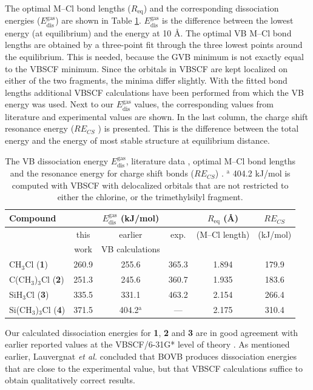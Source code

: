 The optimal M--Cl bond lengths ($R_\mathrm{eq}$) and the corresponding dissociation energies ($E_\mathrm{dis}^\mathrm{gas}$) are shown in Table \ref{ch3.tab.optimal}. $E_\mathrm{dis}^\mathrm{gas}$ is the difference between the lowest energy (at equilibrium) and the energy at 10 \AA. The optimal VB M--Cl bond lengths are obtained by a three-point fit through the three lowest points around the equilibrium. This is needed, because the GVB minimum is not exactly equal to the VBSCF minimum. Since the orbitals in VBSCF are kept localized on either of the two fragments, the minima differ slightly. With the fitted bond lengths additional VBSCF calculations have been performed from which the VB energy was used. Next to our $E_\mathrm{dis}^\mathrm{gas}$ values, the corresponding values from literature and experimental values \cite{lauvergnat,psu} are shown. In the last column, the charge shift resonance energy ($RE_{CS}$ \cite{cs1}) is presented. This is the difference between the total energy and the energy of most stable structure at equilibrium distance. 
\begin{table}[hbtp]
\center
\caption{The VB dissociation energy $E_\mathrm{dis}^\mathrm{gas}$, literature data \cite{lauvergnat,psu}, optimal M--Cl bond lengths and the resonance energy for charge shift bonds ($RE_{CS}$) \cite{cs1}. $^\mathrm{a}$ 404.2 kJ/mol is computed with VBSCF with delocalized orbitals that  are not restricted to either the chlorine, or the trimethylsilyl fragment.}  
\begin{tabular}{|l|c|c|c|c|c|}
\hline
Compound & \multicolumn{3}{c|}{$E_\mathrm{dis}^\mathrm{gas}$ (kJ/mol)} & $R_\mathrm{eq}$ (\AA) & $RE_{CS}$ \\
\hline
&\multicolumn{1}{c|}{this} & \multicolumn{1}{c|}{earlier} & \multicolumn{1}{c|}{exp.} & (M--Cl length) & (kJ/mol) \\
&\multicolumn{1}{c|}{work} & \multicolumn{1}{c|}{VB calculations} & \multicolumn{1}{c|}{} & & \\
\hline
CH$_3$Cl (\textbf{1})& 260.9 & 255.6 \cite{lauvergnat} & 365.3 \cite{lauvergnat} & 1.894 & 179.9\\
C(CH$_3$)$_3$Cl (\textbf{2}) & 251.3 & 245.6 \cite{psu} & 360.7 \cite{psu} & 1.935 & 183.6\\
SiH$_3$Cl (\textbf{3})& 335.5 & 331.1 \cite{lauvergnat} & 463.2 \cite{lauvergnat} & 2.154 & 266.4\\
Si(CH$_3$)$_3$Cl (\textbf{4}) & 371.5 & 404.2$^\mathrm{a}$ \cite{psu} & --- & 2.175 & 310.4\\
\hline
\end{tabular}
\label{ch3.tab.optimal}
\end{table}
Our calculated dissociation energies for \textbf{1}, \textbf{2} and \textbf{3} are in good agreement with earlier reported values at the VBSCF/6-31G* level of theory \cite{lauvergnat, psu}. As mentioned earlier, Lauvergnat \textit{et al.} \cite{lauvergnat} concluded that BOVB produces dissociation energies that are close to the experimental value, but that VBSCF calculations suffice to obtain qualitatively correct results.

